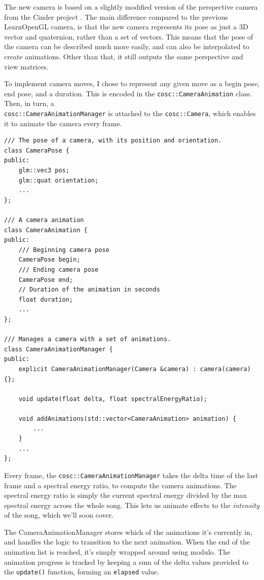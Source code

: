 \documentclass[11pt]{article}
\begin{document}
The new camera is based on a slightly modified version of the perspective camera from the Cinder project
\cite{cinderCamera}. The main difference compared to the previous LearnOpenGL camera, is that the new camera
represents its pose as just a 3D vector and quaternion, rather than a set of vectors. This means that the pose
of the camera can be described much more easily, and can also be interpolated to create animations. Other than
that, it still outputs the same perspective and view matrices.

To implement camera moves, I chose to represent any given move as a begin pose, end pose, and a duration. This
is encoded in the \verb|cosc::CameraAnimation| class. Then, in turn, a \\ \verb|cosc::CameraAnimationManager| is
attached to the \verb|cosc::Camera|, which enables it to animate the camera every frame.

\begin{verbatim}
/// The pose of a camera, with its position and orientation.
class CameraPose {
public:
    glm::vec3 pos;
    glm::quat orientation;
    ...
};

/// A camera animation
class CameraAnimation {
public:
    /// Beginning camera pose
    CameraPose begin;
    /// Ending camera pose
    CameraPose end;
    // Duration of the animation in seconds
    float duration;
    ...
};

/// Manages a camera with a set of animations.
class CameraAnimationManager {
public:
    explicit CameraAnimationManager(Camera &camera) : camera(camera) {};

    void update(float delta, float spectralEnergyRatio);

    void addAnimations(std::vector<CameraAnimation> animation) {
        ...
    }
    ...
};
\end{verbatim}


Every frame, the \verb|cosc::CameraAnimationManager| takes the delta time of the last frame and a spectral
energy ratio, to compute the camera animations. The spectral energy ratio is simply the current spectral
energy divided by the max spectral energy across the whole song. This lets us animate effects to the
\textit{intensity} of the song, which we'll soon cover.

The CameraAnimationManager stores which of the animations it's currently in, and handles the logic to
transition to the next animation. When the end of the animation list is reached, it's simply wrapped around
using modulo. The animation progress is tracked by keeping a sum of the delta values provided to the
\verb|update()| function, forming an \verb|elapsed| value.
\end{document}
